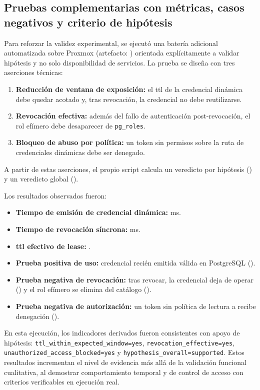 \documentclass[runningheads]{llncs}
\begin{document}
\subsection{Pruebas complementarias con métricas, casos negativos y criterio de hipótesis}
Para reforzar la validez experimental, se ejecutó una batería adicional automatizada sobre Proxmox (artefacto: ) orientada explícitamente a validar hipótesis y no solo disponibilidad de servicios. La prueba se diseña con tres aserciones técnicas:
\begin{enumerate}
    \item \textbf{Reducción de ventana de exposición:} el \gls{ttl} de la credencial dinámica debe quedar acotado y, tras revocación, la credencial no debe reutilizarse.
    \item \textbf{Revocación efectiva:} además del fallo de autenticación post-revocación, el rol efímero debe desaparecer de \texttt{pg\_roles}.
    \item \textbf{Bloqueo de abuso por política:} un token sin permisos sobre la ruta de credenciales dinámicas debe ser denegado.
\end{enumerate}
A partir de estas aserciones, el propio script calcula un veredicto por hipótesis () y un veredicto global ().
\par
Los resultados observados fueron:
\begin{itemize}
    \item \textbf{Tiempo de emisión de credencial dinámica:}  ms.
    \item \textbf{Tiempo de revocación síncrona:}  ms.
    \item \textbf{\gls{ttl} efectivo de lease:} .
    \item \textbf{Prueba positiva de uso:} credencial recién emitida válida en PostgreSQL ().
    \item \textbf{Prueba negativa de revocación:} tras revocar, la credencial deja de operar () y el rol efímero se elimina del catálogo ().
    \item \textbf{Prueba negativa de autorización:} un token sin política de lectura a  recibe denegación ().
\end{itemize}
En esta ejecución, los indicadores derivados fueron consistentes con apoyo de hipótesis: \texttt{ttl\_within\_expected\_window=yes}, \texttt{revocation\_effective=yes}, \texttt{unauthorized\_access\_blocked=yes} y \texttt{hypothesis\_overall=supported}. Estos resultados incrementan el nivel de evidencia más allá de la validación funcional cualitativa, al demostrar comportamiento temporal y de control de acceso con criterios verificables en ejecución real.
\end{document}
